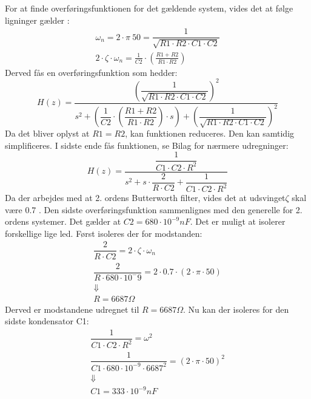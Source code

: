 For at finde overføringsfunktionen for det gældende system, vides det at følge ligninger gælder \cite{Wikilavpas}: 
\begin{equation}
\begin{split}
\omega_n = 2\cdot \pi\ 50 = \dfrac{1}{\sqrt{R1\cdot R2\cdot C1\cdot C2}}\\
2\cdot \zeta\cdot\omega_n =\frac{1}{C2}\cdot \left( \frac{R1+R2}{R1\cdot R2}\right)
\end{split}
\end{equation}
Derved fås en overføringsfunktion som hedder: 
\begin{equation}
H(z)=\frac{\left(\dfrac{1}{\sqrt{R1\cdot R2 \cdot C1\cdot C2}}\right)^2}{s^2+ \left( \dfrac{1}{C2} \cdot \left( \dfrac{R1+R2}{R1\cdot R2}\right) \cdot s \right) +\left( \dfrac{1}{\sqrt{R1\cdot R2 \cdot C1\cdot C2}}\right)^2 }
\end{equation}
Da det bliver oplyst at $ R1=R2 $, kan funktionen reduceres. Den kan samtidig simplificeres. I sidste ende fås funktionen, se Bilag for nærmere udregninger: 
\begin{equation}
H(z)=\dfrac{\dfrac{1}{C1 \cdot C2\cdot R^2}}{s^2+s\cdot \dfrac{2}{R\cdot C2}+ \dfrac{1}{C1\cdot C2\cdot R^2}}
\end{equation}
Da der arbejdes med at 2. ordens Butterworth filter, vides det at udsvinget$ \zeta $ skal være 0.7 \cite{ASB}. 
Den sidste overføringsfunktion sammenlignes med den generelle for 2. ordens systemer. Det gælder at $ C2 = 680\cdot 10^{-9} nF $. Det er muligt at isolerer forskellige lige led. Først isoleres der for modstanden: 
\begin{equation}
\begin{split}
\dfrac{2}{R\cdot C2}= 2\cdot \zeta \cdot \omega_n\\
\dfrac{2}{R\cdot 680\cdot 10^-9}=2\cdot 0.7 \cdot(2\cdot\pi\cdot 50)\\
\Downarrow\\
 R= 6687 \Omega
\end{split}
\end{equation}
Derved er modstandene udregnet til $ R = 6687\Omega $. Nu kan der isoleres for den sidste kondensator C1: 
\begin{equation}
\begin{split}
\dfrac{1}{C1\cdot C2\cdot R^2}= \omega^2\\
\dfrac{1}{C1\cdot 680\cdot 10^{-9}\cdot 6687^2}= (2\cdot \pi \cdot 50)^2\\
\Downarrow\\
C1=333\cdot 10^{-9} nF
\end{split}
\end{equation}
